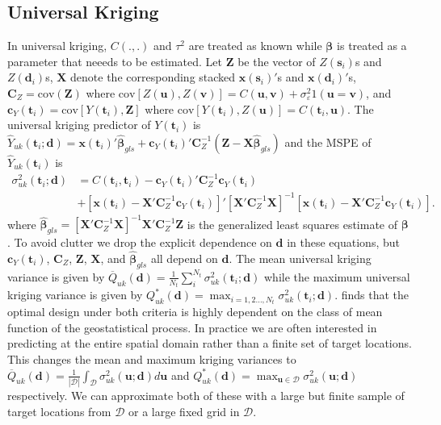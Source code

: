 \documentclass[cmbright]{staauth}
\newcommand{\cov}{\mathrm{cov}}
\begin{document}
\subsection{Universal Kriging}
In universal kriging, $C(.,.)$ and $\tau^2$ are treated as known while $\bm{\beta}$ is treated as a parameter that neeeds to be estimated. Let $\bm{Z}$ be the vector of $Z(\bm{s}_i)$s and $Z(\bm{d}_i)$s, $\bm{X}$ denote the corresponding stacked $\bm{x}(\bm{s}_i)'$s and $\bm{x}(\bm{d}_i)'$s, $\bm{C}_Z = \cov(\bm{Z})$ where $\cov[Z(\bm{u}), Z(\bm{v})] = C(\bm{u},\bm{v}) + \sigma^2_\varepsilon 1(\bm{u} = \bm{v})$, and $\bm{c}_Y(\bm{t}_i) = \cov[Y(\bm{t}_i), \bm{Z}]$ where $\cov[Y(\bm{t}_i), Z(\bm{u})] = C(\bm{t}_i, \bm{u})$. The universal kriging predictor of $Y(\bm{t}_i)$ is $\widehat{Y}_{uk}(\bm{t}_i;\bm{d}) = \bm{x}(\bm{t}_i)'\widehat{\bm{\beta}}_{gls} + \bm{c}_Y(\bm{t}_i)'\bm{C}_Z^{-1}(\bm{Z} - \bm{X}\widehat{\bm{\beta}}_{gls})$ and the MSPE of $\widehat{Y}_{uk}(\bm{t}_i)$ is
\begin{align*}
\sigma_{uk}^2(\bm{t}_i;\bm{d}) &= C(\bm{t}_i, \bm{t}_i) - \bm{c}_Y(\bm{t}_i)'\bm{C}_Z^{-1}\bm{c}_Y(\bm{t}_i)  \\
& + [\bm{x}(\bm{t}_i)  - \bm{X}'\bm{C}_Z^{-1}\bm{c}_Y(\bm{t}_i)]'[\bm{X}'\bm{C}_Z^{-1}\bm{X}]^{-1}[\bm{x}(\bm{t}_i)  - \bm{X}'\bm{C}_Z^{-1}\bm{c}_Y(\bm{t}_i)].
\end{align*}
where $\widehat{\bm{\beta}}_{gls} = [\bm{X}'\bm{C}_Z^{-1}\bm{X}]^{-1}\bm{X}'\bm{C}_Z^{-1}\bm{Z}$ is the generalized least squares estimate of $\bm{\beta}$ \citep[Section~4.1.2]{cressie2011statistics}. To avoid clutter we drop the explicit dependence on $\bm{d}$ in these equations, but $\bm{c}_Y(\bm{t}_i)$, $\bm{C}_Z$, $\bm{Z}$, $\bm{X}$, and $\widehat{\bm{\beta}}_{gls}$ all depend on $\bm{d}$. The mean universal kriging variance is given by $\overline{Q}_{uk}(\bm{d}) = \frac{1}{N_t}\sum_{i}^{N_t}\sigma^2_{uk}(\bm{t}_i;\bm{d})$ while the maximum universal kriging variance is given by $Q_{uk}^*(\bm{d}) = \max_{i=1,2\dots,N_t}\sigma^2_{uk}(\bm{t}_i;\bm{d})$. \cite{zimmerman2006optimal} finds that the optimal design under both criteria is highly dependent on the class of mean function of the geostatistical process. In practice we are often interested in predicting at the entire spatial domain rather than a finite set of target locations. This changes the mean and maximum kriging variances to $\overline{Q}_{uk}(\bm{d}) = \frac{1}{|\mathcal{D}|}\int_{\mathcal{D}}\sigma^2_{uk}(\bm{u};\bm{d})d\bm{u}$ and $Q_{uk}^*(\bm{d}) = \max_{\bm{u}\in\mathcal{D}}\sigma^2_{uk}(\bm{u};\bm{d})$ respectively. We can approximate both of these with a large but finite sample of target locations from $\mathcal{D}$ or a large fixed grid in $\mathcal{D}$.
\end{document}
